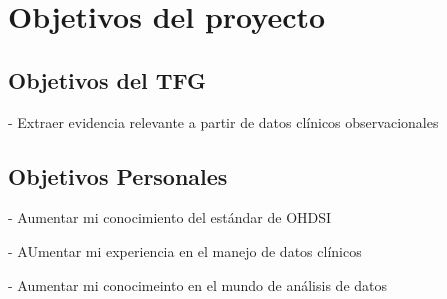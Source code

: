 \chapter{Objetivos del proyecto}\label{cap:objetivos}

\section{Objetivos del TFG}

- Extraer evidencia relevante a partir de datos clínicos observacionales


\section{Objetivos Personales}

- Aumentar mi conocimiento del estándar de OHDSI

- AUmentar mi experiencia en el manejo de datos clínicos

- Aumentar mi conocimeinto en el mundo de análisis de datos